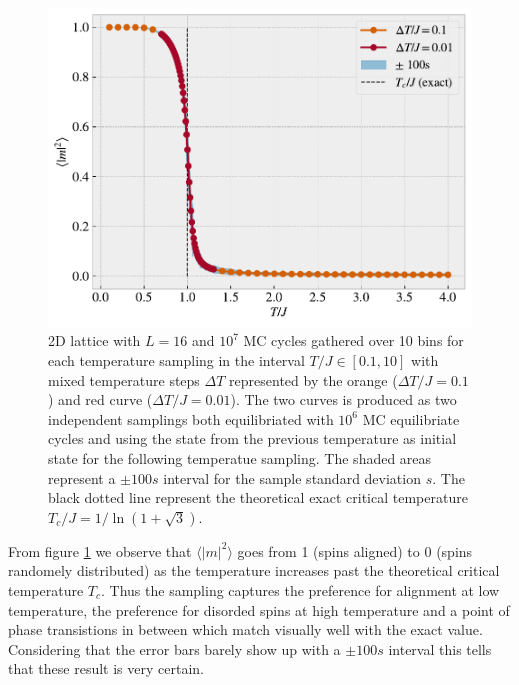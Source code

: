 \documentclass[reprint, amsmath, amssymb, aps, onecolumn]{revtex4-2}
\begin{document}
{{\begin{figure}[H]
  \centering
  \includegraphics[width=0.6\linewidth]{figures/fig2d.pdf}
  \caption{2D lattice with $L = 16$ and $10^7$ MC cycles gathered over 10 bins for each temperature sampling in the interval $T/J \in [0.1, 10]$ with mixed temperature steps $\Delta T$ represented by the orange ($\Delta T/J = 0.1$) and red curve ($\Delta T/J = 0.01$). The two curves is produced as two independent samplings both equilibriated with $10^6$ MC equilibriate cycles and using the state from the previous temperature as initial state for the following temperatue sampling. The shaded areas represent a $\pm 100 s$ interval for the sample standard deviation $s$. The black dotted line represent the theoretical exact critical temperature $T_c/J = 1/\ln{(1 + \sqrt{3})}$.}
  \label{fig:fig2d}
\end{figure}

From figure \ref{fig:fig2d} we observe that $\langle |m|^2 \rangle$ goes from 1 (spins aligned) to 0 (spins randomely distributed) as the temperature increases past the theoretical critical temperature $T_c$. Thus the sampling captures the preference for alignment at low temperature, the preference for disorded spins at high temperature and a point of phase transistions in between which match visually well with the exact value. Considering that the error bars barely show up with a $\pm 100s$ interval this tells that these result is very certain.


}}
\end{document}
